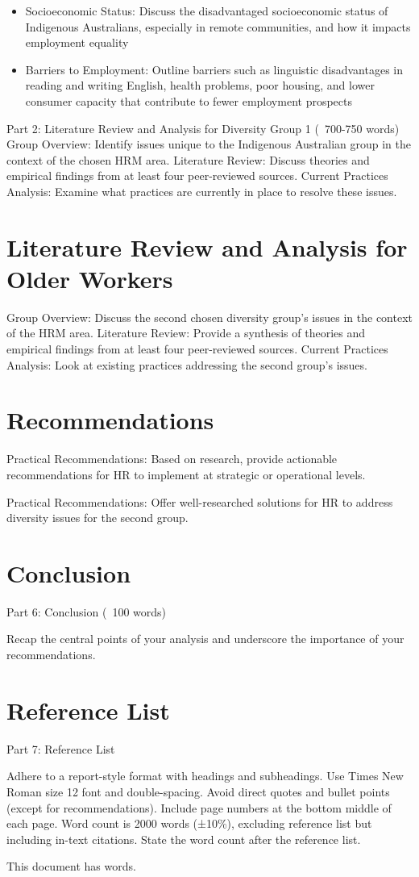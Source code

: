 \documentclass{article}
\begin{document}
\begin{itemize}
	\item Socioeconomic Status: Discuss the disadvantaged socioeconomic status of Indigenous Australians, especially in remote communities, and how it impacts employment equality 
	\item  Barriers to Employment: Outline barriers such as linguistic disadvantages in reading and writing English, health problems, poor housing, and lower consumer capacity that contribute to fewer employment prospects
\end{itemize}
Part 2: Literature Review and Analysis for Diversity Group 1 (~700-750 words) 
Group Overview: Identify issues unique to the Indigenous Australian group in the context of the chosen HRM area.
Literature Review: Discuss theories and empirical findings from at least four peer-reviewed sources.
Current Practices Analysis: Examine what practices are currently in place to resolve these issues.

\section{Literature Review and Analysis for Older Workers}
Group Overview: Discuss the second chosen diversity group's issues in the context of the HRM area.
Literature Review: Provide a synthesis of theories and empirical findings from at least four peer-reviewed sources.
Current Practices Analysis: Look at existing practices addressing the second group’s issues.

\section{Recommendations}
Practical Recommendations: Based on research, provide actionable recommendations for HR to implement at strategic or operational levels.

Practical Recommendations: Offer well-researched solutions for HR to address diversity issues for the second group.

\section{Conclusion}
Part 6: Conclusion (~100 words)

Recap the central points of your analysis and underscore the importance of your recommendations.
\section{Reference List}
Part 7: Reference List

Adhere to a report-style format with headings and subheadings.
Use Times New Roman size 12 font and double-spacing.
Avoid direct quotes and bullet points (except for recommendations).
Include page numbers at the bottom middle of each page.
Word count is 2000 words (±10\%), excluding reference list but including in-text citations.
State the word count after the reference list.

\printbibliography
This document has \emph{\bashStdout} words.
\end{document}
